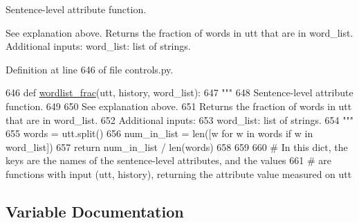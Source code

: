 \begin{DoxyVerb}Sentence-level attribute function.

See explanation above.
Returns the fraction of words in utt that are in word_list.
Additional inputs:
  word_list: list of strings.
\end{DoxyVerb}
 

Definition at line 646 of file controls.\+py.


\begin{DoxyCode}
646 \textcolor{keyword}{def }\hyperlink{namespaceprojects_1_1controllable__dialogue_1_1controllable__seq2seq_1_1controls_a7500dad14e58978ad3903db08a10579e}{wordlist\_frac}(utt, history, word\_list):
647     \textcolor{stringliteral}{"""}
648 \textcolor{stringliteral}{    Sentence-level attribute function.}
649 \textcolor{stringliteral}{}
650 \textcolor{stringliteral}{    See explanation above.}
651 \textcolor{stringliteral}{    Returns the fraction of words in utt that are in word\_list.}
652 \textcolor{stringliteral}{    Additional inputs:}
653 \textcolor{stringliteral}{      word\_list: list of strings.}
654 \textcolor{stringliteral}{    """}
655     words = utt.split()
656     num\_in\_list = len([w \textcolor{keywordflow}{for} w \textcolor{keywordflow}{in} words \textcolor{keywordflow}{if} w \textcolor{keywordflow}{in} word\_list])
657     \textcolor{keywordflow}{return} num\_in\_list / len(words)
658 
659 
660 \textcolor{comment}{# In this dict, the keys are the names of the sentence-level attributes, and the values}
661 \textcolor{comment}{# are functions with input (utt, history), returning the attribute value measured on utt}
\end{DoxyCode}


\subsection{Variable Documentation}
\mbox{\label{namespaceprojects_1_1controllable__dialogue_1_1controllable__seq2seq_1_1controls_af1a8cf95077ab1de45a68b6756a3b2a5}} 
